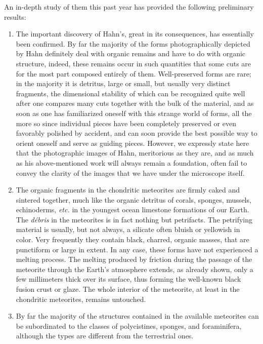 \documentclass[a4paper, 12pt, oneside]{article}
\begin{document}
An in-depth study of them this past year has provided the following preliminary results:
\begin{enumerate}
\item The important discovery of Hahn's, great in its consequences, has essentially been confirmed. By far the majority of the forms photographically depicted by Hahn definitely deal with organic remains and have to do with organic structure, indeed, these remains occur in such quantities that some cuts are for the most part composed entirely of them. Well-preserved forms are rare; in the majority it is detritus, large or small, but usually very distinct fragments, the dimensional stability of which can be recognized quite well after one compares many cuts together with the bulk of the material, and as soon as one has familiarized oneself with this strange world of forms, all the more so since individual pieces have been completely preserved or even favorably polished by accident, and can soon provide the best possible way to orient oneself and serve as guiding pieces. However, we expressly state here that the photographic images of Hahn, meritorious as they are, and as much as his above-mentioned work will always remain a foundation, often fail to convey the clarity of the images that we have under the microscope itself.

\item The organic fragments in the chondritic meteorites are firmly caked and sintered together, much like the organic detritus of corals, sponges, mussels, echinoderms, \emph{etc.} in the youngest ocean limestone formations of our Earth. The \emph{débris} in the meteorites is in fact nothing but petrifacts. The petrifying material is usually, but not always, a silicate often bluish or yellowish in color. Very frequently they contain black, charred, organic masses, that are punctiform or large in extent. In any case, these forms have not experienced a melting process. The melting produced by friction during the passage of the meteorite through the Earth's atmosphere extends, as already shown, only a few millimeters thick over its surface, thus forming the well-known black fusion crust or glaze. The whole interior of the meteorite, at least in the chondritic meteorites, remains untouched.

\item By far the majority of the structures contained in the available meteorites can be subordinated to the classes of polycistines, sponges, and foraminifera, although the types are different from the terrestrial ones.


\end{enumerate}
\end{document}
